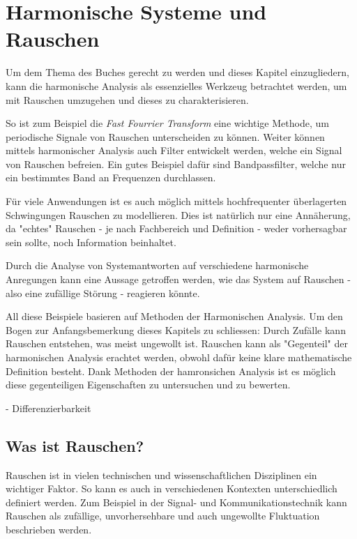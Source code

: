 %
%
%
%


\section{Harmonische Systeme und Rauschen\label{brown:Rauschen}}

Um dem Thema des Buches gerecht zu werden und dieses Kapitel einzugliedern, kann die harmonische Analysis als essenzielles Werkzeug betrachtet werden, um mit Rauschen umzugehen und dieses zu charakterisieren. 

So ist zum Beispiel die \textit{Fast Fourrier Transform} eine wichtige Methode, um periodische Signale von Rauschen unterscheiden zu können.
Weiter können mittels harmonischer Analysis auch Filter entwickelt werden, welche ein Signal von Rauschen befreien. Ein gutes Beispiel dafür sind Bandpassfilter, welche nur ein bestimmtes Band an Frequenzen durchlassen.

Für viele Anwendungen ist es auch möglich mittels hochfrequenter überlagerten Schwingungen Rauschen zu modellieren. Dies ist natürlich nur eine Annäherung, da "echtes" Rauschen - je nach Fachbereich und Definition - weder vorhersagbar sein sollte, noch Information beinhaltet. 

Durch die Analyse von Systemantworten auf verschiedene harmonische Anregungen kann eine Aussage getroffen werden, wie das System auf Rauschen - also eine zufällige Störung - reagieren könnte.

All diese Beispiele basieren auf Methoden der Harmonischen Analysis. Um den Bogen zur Anfangsbemerkung dieses Kapitels zu schliessen: Durch Zufälle kann Rauschen entstehen, was meist ungewollt ist. Rauschen kann als "Gegenteil" der harmonischen Analysis erachtet werden, obwohl dafür keine klare mathematische Definition besteht. Dank Methoden der hamronsichen Analysis ist es möglich diese gegenteiligen Eigenschaften zu untersuchen und zu bewerten.

- Differenzierbarkeit



\subsection{Was ist Rauschen?\label{brown:Rauschen:Arten}}
Rauschen ist in vielen technischen und wissenschaftlichen Disziplinen ein wichtiger Faktor. So kann es auch in verschiedenen Kontexten unterschiedlich definiert werden. 
Zum Beispiel in der Signal- und Kommunikationstechnik kann Rauschen als zufällige, unvorhersehbare und auch ungewollte Fluktuation beschrieben werden. 

